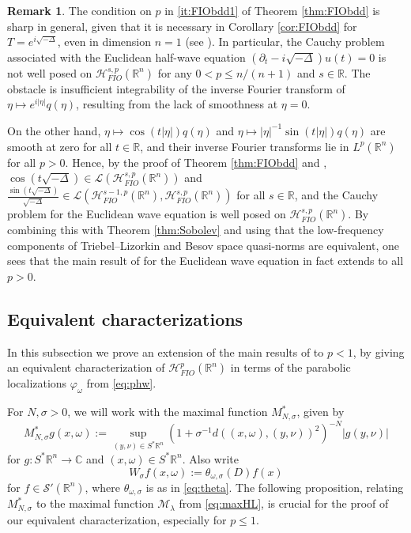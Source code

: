 \documentclass{amsart}
\newcommand {\C}{{\mathbb C}}
\newcommand {\HT}{\mathcal{H}}
\newcommand {\Hp}{\mathcal{H}^{p}_{FIO}(\Rn)}
\newcommand {\Hps}{\mathcal{H}^{s,p}_{FIO}(\Rn)}
\newcommand {\la}{\lambda}
\newcommand {\La}{\mathcal{L}}
\newcommand {\Ma}{\mathcal{M}}
\newcommand {\ph}{\varphi}
\newcommand {\R}{\mathbb R}
\newcommand {\Rn}{\mathbb{R}^{n}}
\newcommand {\Sp}{S^{*}\Rn}
\newcommand {\Sw}{\mathcal{S}}
\newcommand {\w}{\omega}
\theoremstyle{definition}
\newtheorem{remark}[theorem]{Remark}
\numberwithin{equation}{section}
\begin{document}
\begin{remark}\label{rem:Euclidwave}
The condition on $p$ in \eqref{it:FIObdd1} of Theorem \ref{thm:FIObdd} is sharp in general, given that it is necessary in Corollary \ref{cor:FIObdd} for $T=e^{i\sqrt{-\Delta}}$, even in dimension $n=1$ (see \cite[Section 9]{IsRoSt21}). In particular, the Cauchy problem associated with the Euclidean half-wave equation $(\partial_{t}-i\sqrt{-\Delta})u(t)=0$ is not well posed on $\Hps$ for any $0<p\leq n/(n+1)$ and $s\in\R$. %
The obstacle is insufficient integrability of the inverse Fourier transform of $\eta\mapsto e^{i|\eta|}q(\eta)$, resulting from the lack of smoothness at $\eta=0$.

On the other hand, $\eta\mapsto \cos(t|\eta|)q(\eta)$ and $\eta\mapsto |\eta|^{-1}\sin(t|\eta|)q(\eta)$ are smooth at zero for all $t\in\R$, and their inverse Fourier transforms lie in $L^{p}(\Rn)$ for all $p>0$. %
Hence, by the proof of Theorem \ref{thm:FIObdd} and \cite[Proposition 1.5.3]{Triebel10}, $\cos(t\sqrt{-\Delta})\in\La(\Hps)$ and $\frac{\sin(t\sqrt{-\Delta})}{\sqrt{-\Delta}}\in\La(\HT^{s-1,p}_{FIO}(\Rn),\Hps)$ for all %
$s\in\R$, and the Cauchy problem for the Euclidean wave equation is well posed on $\Hps$. By combining this with Theorem \ref{thm:Sobolev} and using that the low-frequency components of Triebel--Lizorkin and Besov space quasi-norms are equivalent, one sees that the main result of \cite{IsRoSt21} for the Euclidean wave equation in fact extends to all $p>0$. 
\end{remark}









\subsection{Equivalent characterizations}\label{subsec:charac}

In this subsection we prove an extension of the main results of \cite{FaLiRoSo23,Rozendaal21} to $p<1$, by giving an equivalent characterization of $\Hp$ in terms of the parabolic localizations $\ph_{\w}$ from \eqref{eq:phw}.

For $N,\sigma>0$, we will work with the maximal function $M_{N,\sigma}^{*}$, given by
\[
M_{N,\sigma}^{*}{g}(x,\omega)
:=\sup_{(y,\nu)\in \Sp}(1+\sigma^{-1}d((x,\omega),(y,\nu))^{2})^{-N}|{g}(y,\nu)|
\]
for ${g}:\Sp\to\C$ and $(x,\w)\in\Sp$. Also write
\[
W_{\sigma}f(x,\w):=\theta_{\w,\sigma}(D)f(x)
\]
for $f\in\Sw'(\Rn)$, where $\theta_{\w,\sigma}$ is as in \eqref{eq:theta}. The following proposition, relating $M_{N,\sigma}^{*}$ to the maximal function $\Ma_{\la}$ from \eqref{eq:maxHL}, is crucial for the proof of our equivalent characterization, especially for $p\leq 1$.
\end{document}
